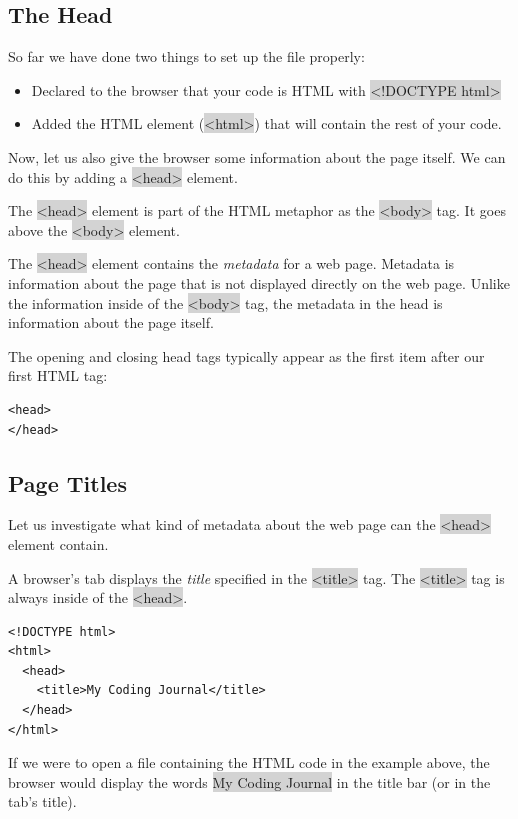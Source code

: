 \documentclass[11pt]{article}
\begin{document}
\subsection{The Head}
So far we have done two things to set up the file properly:
\begin{itemize}[leftmargin = *]
\item Declared to the browser that your code is HTML with \colorbox{lightgray}{<!DOCTYPE html>}
\item Added the HTML element (\colorbox{lightgray}{<html>}) that will contain the rest of your code.
\end{itemize}
Now, let us also give the browser some information about the page itself. We can do this by adding a \colorbox{lightgray}{<head>} element.

The \colorbox{lightgray}{<head>} element is part of the HTML metaphor as the \colorbox{lightgray}{<body>} tag. It goes above the \colorbox{lightgray}{<body>} element.

The \colorbox{lightgray}{<head>} element contains the \textit{metadata} for a web page. Metadata is information about the page that is not displayed directly on the web page. Unlike the information inside of the \colorbox{lightgray}{<body>} tag, the metadata in the head is information about the page itself. 

The opening and closing head tags typically appear as the first item after our first HTML tag:
\begin{lstlisting}
<head>
</head>
\end{lstlisting}

\subsection{Page Titles}
Let us investigate what kind of metadata about the web page can the \colorbox{lightgray}{<head>} element contain.

A browser’s tab displays the \textit{title} specified in the \colorbox{lightgray}{<title>} tag. The \colorbox{lightgray}{<title>} tag is always inside of the \colorbox{lightgray}{<head>}.
\begin{lstlisting}
<!DOCTYPE html>
<html>
  <head>
    <title>My Coding Journal</title>
  </head>
</html>
\end{lstlisting}
If we were to open a file containing the HTML code in the example above, the browser would display the words \colorbox{lightgray}{My Coding Journal} in the title bar (or in the tab’s title).
\end{document}
